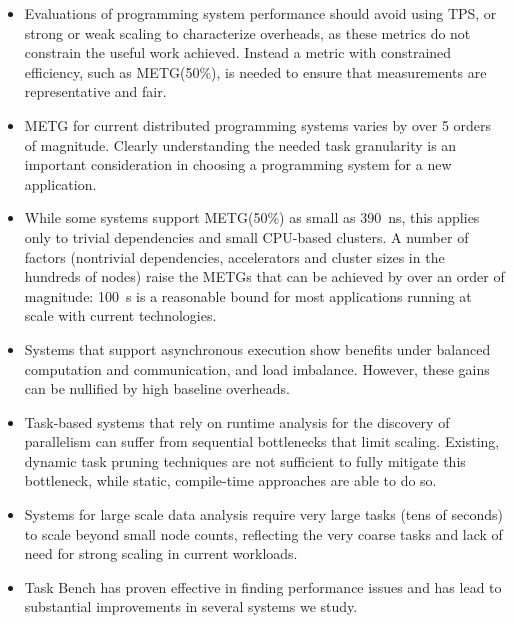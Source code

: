 \begin{itemize}
\item Evaluations of programming system performance should avoid using
  TPS, or strong or weak scaling to characterize overheads, as these metrics do
  not constrain the useful work achieved. Instead a metric with
  constrained efficiency, such as METG(50\%), is needed to ensure that
  measurements are representative and fair.

\item METG for current distributed programming systems varies by over
  5 orders of magnitude.  Clearly understanding the needed task
  granularity is an important consideration in choosing a programming
  system for a new application.

\item While some systems support METG(50\%) as small as 390~ns, this applies only to trivial dependencies and small CPU-based clusters. A number of factors (nontrivial dependencies, accelerators and cluster sizes in the hundreds of nodes) raise
  the METGs that can be achieved by over an order of magnitude: 100~\textmu{}s is a reasonable bound for most applications running at scale with current technologies.

\item Systems that support asynchronous execution show benefits under
  balanced computation
  and communication, and load imbalance. However, these gains can be nullified by
  high baseline overheads.

\item Task-based systems that rely on runtime analysis for the
  discovery of parallelism can suffer from sequential bottlenecks that
  limit scaling. Existing, dynamic task pruning techniques are not
  sufficient to fully mitigate this bottleneck, while static,
  compile-time approaches are able to do so.

\item Systems for large scale data analysis require very large tasks
  (tens of seconds) to scale beyond small node counts,
  reflecting the very coarse tasks and lack of need for strong scaling
  in current workloads.

\item Task Bench has proven effective in finding performance issues
  and has lead to substantial improvements in several systems
  we study.
\end{itemize}


